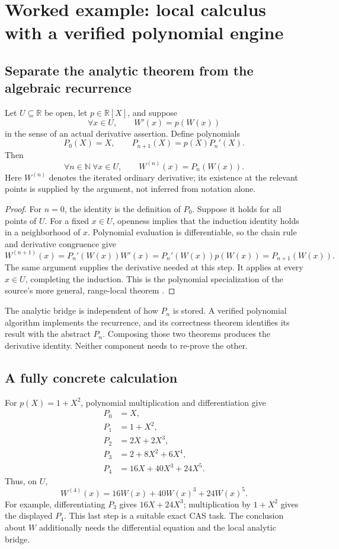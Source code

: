\documentclass[11pt,letterpaper]{article}
\newcommand{\N}{\mathbb N}
\newcommand{\R}{\mathbb R}
\numberwithin{equation}{section}
\begin{document}
\section{Worked example: local calculus with a verified polynomial engine}\label{sec:ode}
\subsection{Separate the analytic theorem from the algebraic recurrence}
Let $U\subseteq\R$ be open, let $p\in\R[X]$, and suppose
\[
 \forall x\in U,\qquad W'(x)=p(W(x))
\]
in the sense of an actual derivative assertion. Define polynomials
\begin{equation}
 P_0(X)=X,\qquad P_{n+1}(X)=p(X)P_n'(X).               \label{eq:polyrec}
\end{equation}
Then
\begin{equation}
 \forall n\in\N\ \forall x\in U,\qquad
 W^{(n)}(x)=P_n(W(x)).                                \label{eq:ode}
\end{equation}
Here $W^{(n)}$ denotes the iterated ordinary derivative; its existence at the
relevant points is supplied by the argument, not inferred from notation alone.

\begin{proof}
For $n=0$, the identity is the definition of $P_0$. Suppose it holds for all
points of $U$. For a fixed $x\in U$, openness implies that the induction identity
holds in a neighborhood of $x$. Polynomial evaluation is differentiable, so the
chain rule and derivative congruence give
\[
 W^{(n+1)}(x)=P_n'(W(x))W'(x)
 =P_n'(W(x))p(W(x))=P_{n+1}(W(x)).
\]
The same argument supplies the derivative needed at this step. It applies at
every $x\in U$, completing the induction. This is the polynomial specialization
of the source's more general, range-local theorem \cite{p-ode}.
\end{proof}

The analytic bridge is independent of how $P_n$ is stored. A verified polynomial
algorithm implements the recurrence, and its correctness theorem identifies its
result with the abstract $P_n$. Composing those two theorems produces the derivative
identity. Neither component needs to re-prove the other.

\subsection{A fully concrete calculation}
For $p(X)=1+X^2$, polynomial multiplication and differentiation give
\begin{align*}
 P_0&=X,\\
 P_1&=1+X^2,\\
 P_2&=2X+2X^3,\\
 P_3&=2+8X^2+6X^4,\\
 P_4&=16X+40X^3+24X^5.
\end{align*}
Thus, on $U$,
\[
 W^{(4)}(x)=16W(x)+40W(x)^3+24W(x)^5.
\]
For example, differentiating $P_3$ gives $16X+24X^3$; multiplication by
$1+X^2$ gives the displayed $P_4$. This last step is a suitable exact CAS task.
The conclusion about $W$ additionally needs the differential equation and the
local analytic bridge.
\end{document}
